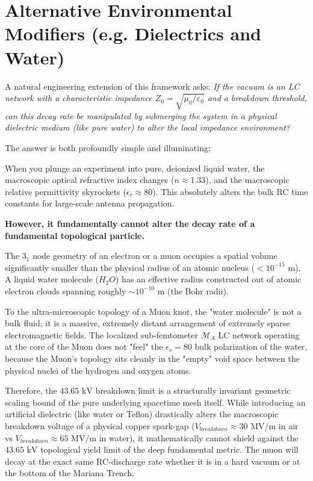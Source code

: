 \section{Alternative Environmental Modifiers (e.g. Dielectrics and Water)}
A natural engineering extension of this framework asks: \textit{If the vacuum is an LC network with a characteristic impedance $Z_0 = \sqrt{\mu_0/\varepsilon_0}$ and a breakdown threshold, can this decay rate be manipulated by submerging the system in a physical dielectric medium (like pure water) to alter the local impedance environment?}

The answer is both profoundly simple and illuminating:

When you plunge an experiment into pure, deionized liquid water, the macroscopic optical refractive index changes ($n \approx 1.33$), and the macroscopic relative permittivity skyrockets ($\epsilon_r \approx 80$). This absolutely alters the bulk RC time constants for large-scale antenna propagation.

\textbf{However, it fundamentally cannot alter the decay rate of a fundamental topological particle.} 

The $3_1$ node geometry of an electron or a muon occupies a spatial volume significantly smaller than the physical radius of an atomic nucleus ($< 10^{-15} \text{ m}$). A liquid water molecule ($H_2O$) has an effective radius constructed out of atomic electron clouds spanning roughly $\sim 10^{-10} \text{ m}$ (the Bohr radii). 

To the ultra-microscopic topology of a Muon knot, the "water molecule" is not a bulk fluid; it is a massive, extremely distant arrangement of extremely sparse electromagnetic fields. The localized sub-femtometer $\mathcal{M}_A$ LC network operating at the core of the Muon does not "feel" the $\epsilon_r = 80$ bulk polarization of the water, because the Muon's topology sits cleanly in the "empty" void space between the physical nuclei of the hydrogen and oxygen atoms.

Therefore, the $43.65 \text{ kV}$ breakdown limit is a structurally invariant geometric scaling bound of the pure underlying spacetime mesh itself. While introducing an artificial dielectric (like water or Teflon) drastically alters the macroscopic breakdown voltage of a physical copper spark-gap ($V_{breakdown} \approx 30 \text{ MV/m}$ in air vs $V_{breakdown} \approx 65 \text{ MV/m}$ in water), it mathematically cannot shield against the $43.65 \text{ kV}$ topological yield limit of the deep fundamental metric. The muon will decay at the exact same RC-discharge rate whether it is in a hard vacuum or at the bottom of the Mariana Trench.
